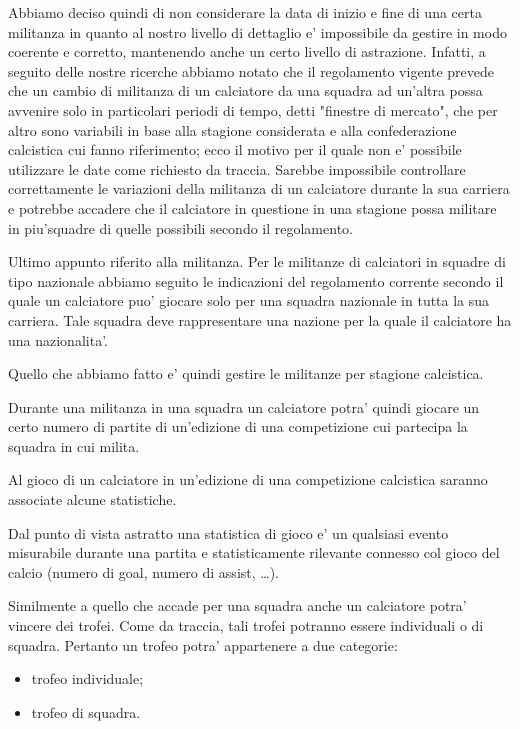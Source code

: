 Abbiamo deciso quindi di non considerare la data di inizio e fine di una certa militanza in
quanto al nostro livello di dettaglio e' impossibile da gestire in modo coerente e corretto,
mantenendo anche un certo livello di astrazione.
Infatti, a seguito delle nostre ricerche abbiamo notato che il regolamento vigente
prevede che un cambio di militanza di un calciatore da una squadra ad un'altra
possa avvenire solo in particolari periodi di tempo, detti "finestre di mercato",
che per altro sono variabili in base alla stagione considerata e alla confederazione
calcistica cui fanno riferimento; ecco il motivo per il quale non e' possibile utilizzare
le date come richiesto da traccia.
Sarebbe impossibile controllare correttamente le variazioni della militanza di un calciatore
durante la sua carriera e potrebbe accadere che il calciatore in questione in una stagione
possa militare in piu'squadre di quelle possibili secondo il regolamento.

Ultimo appunto riferito alla militanza. Per le militanze di calciatori in squadre di tipo
nazionale abbiamo seguito le indicazioni del regolamento corrente secondo il quale un calciatore
puo' giocare solo per una squadra nazionale in tutta la sua carriera. Tale squadra
deve rappresentare una nazione per la quale il calciatore ha una nazionalita'.

Quello che abbiamo fatto e' quindi gestire le militanze per stagione calcistica.

Durante una militanza in una squadra un calciatore potra' quindi giocare un certo numero di
partite di un'edizione di una competizione cui partecipa la squadra in cui milita.

Al gioco di un calciatore in un'edizione di una competizione calcistica saranno associate
alcune statistiche.

Dal punto di vista astratto una statistica di gioco e' un qualsiasi evento misurabile durante
una partita e statisticamente rilevante connesso col gioco del calcio
(numero di goal, numero di assist, \dots).

Similmente a quello che accade per una squadra anche un calciatore potra' vincere dei trofei.
Come da traccia, tali trofei potranno essere individuali o di squadra.
Pertanto un trofeo potra' appartenere a due categorie:
\begin{itemize}
	\item trofeo individuale;
	\item trofeo di squadra.
\end{itemize}

